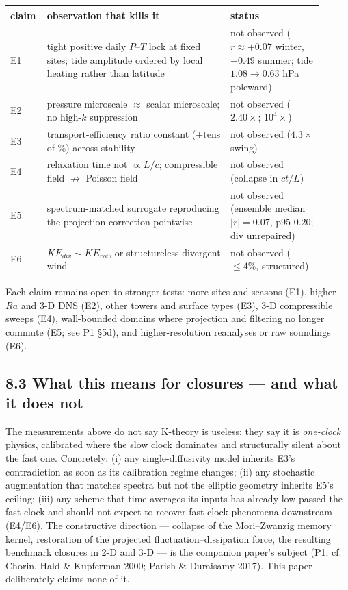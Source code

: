 \documentclass[aps,prfluids,preprint,superscriptaddress,nofootinbib]{revtex4-2}
\begin{document}
\begin{center}
\begin{tabular}{p{0.08\linewidth}p{0.55\linewidth}p{0.28\linewidth}}
\toprule
claim & observation that kills it & status \\
\midrule
E1 & tight positive daily $P$--$T$ lock at fixed sites; tide amplitude ordered by local heating rather than latitude & not observed ($r\approx+0.07$ winter, $-0.49$ summer; tide $1.08\to0.63$ hPa poleward) \\
E2 & pressure microscale $\approx$ scalar microscale; no high-$k$ suppression & not observed ($2.40\times$; $10^{4}\times$) \\
E3 & transport-efficiency ratio constant ($\pm$tens of \%) across stability & not observed ($4.3\times$ swing) \\
E4 & relaxation time not $\propto L/c$; compressible field $\not\to$ Poisson field & not observed (collapse in $ct/L$) \\
E5 & spectrum-matched surrogate reproducing the projection correction pointwise & not observed (ensemble median $|r|=0.07$, p95 $0.20$; div unrepaired) \\
E6 & $KE_{div}\sim KE_{rot}$, or structureless divergent wind & not observed ($\le 4\%$, structured) \\
\bottomrule
\end{tabular}
\end{center}

Each claim remains open to stronger tests: more sites and seasons (E1), higher-$Ra$ and 3-D DNS (E2), other towers and surface types (E3), 3-D compressible sweeps (E4), wall-bounded domains where projection and filtering no longer commute (E5; see P1 \S5d), and higher-resolution reanalyses or raw soundings (E6).

\subsection*{8.3 What this means for closures --- and what it does not}

The measurements above do not say K-theory is useless; they say it is \emph{one-clock} physics, calibrated where the slow clock dominates and structurally silent about the fast one. Concretely: (i) any single-diffusivity model inherits E3's contradiction as soon as its calibration regime changes; (ii) any stochastic augmentation that matches spectra but not the elliptic geometry inherits E5's ceiling; (iii) any scheme that time-averages its inputs has already low-passed the fast clock and should not expect to recover fast-clock phenomena downstream (E4/E6). The constructive direction --- collapse of the Mori--Zwanzig memory kernel, restoration of the projected fluctuation--dissipation force, the resulting benchmark closures in 2-D and 3-D --- is the companion paper's subject (P1; cf. Chorin, Hald \& Kupferman 2000; Parish \& Duraisamy 2017). This paper deliberately claims none of it.
\end{document}
